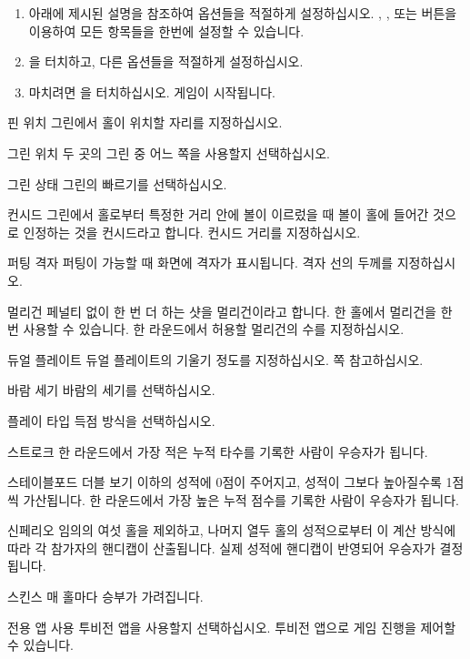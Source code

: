 \documentclass[10pt, openright, language=korean]{hzguide}
\begin{document}
\begin{enumerate}
\item 아래에 제시된 설명을 참조하여 옵션들을 적절하게 설정하십시오. , , 또는  버튼을 이용하여 모든 항목들을 한번에 설정할 수 있습니다.
\item {}을 터치하고, 다른 옵션들을 적절하게 설정하십시오. 
\item 마치려면 을 터치하십시오. 게임이 시작됩니다.
\end{enumerate}

\begin{UI}
\item[핀 위치] 그린에서 홀이 위치할 자리를 지정하십시오.
\item[그린 위치] 두 곳의 그린 중 어느 쪽을 사용할지 선택하십시오.
\item[그린 상태] 그린의 빠르기를 선택하십시오.
\item[컨시드] 그린에서 홀로부터 특정한 거리 안에 볼이 이르렀을 때 볼이 홀에 들어간 것으로 인정하는 것을 컨시드라고 합니다. 컨시드 거리를 지정하십시오.
\item[퍼팅 격자] 퍼팅이 가능할 때 화면에 격자가 표시됩니다. 격자 선의 두께를 지정하십시오.
\item[멀리건] 페널티 없이 한 번 더 하는 샷을 멀리건이라고 합니다. 한 홀에서 멀리건을 한 번 사용할 수 있습니다. 한 라운드에서 허용할 멀리건의 수를 지정하십시오.
\item[듀얼 플레이트] 듀얼 플레이트의 기울기 정도를 지정하십시오. \pageref{sec:swing_plate} 쪽 \를 참고하십시오.
\item[바람 세기] 바람의 세기를 선택하십시오.
\item[플레이 타입] 득점 방식을 선택하십시오.
    \begin{UI}
    \item[스트로크] 한 라운드에서 가장 적은 누적 타수를 기록한 사람이 우승자가 됩니다.
    \item[스테이블포드] 더블 보기 이하의 성적에 0점이 주어지고, 성적이 그보다 높아질수록 1점씩 가산됩니다. 한 라운드에서 가장 높은 누적 점수를 기록한 사람이 우승자가 됩니다.
    \item[신페리오] 임의의 여섯 홀을 제외하고, 나머지 열두 홀의 성적으로부터 이 계산 방식에 따라 각 참가자의 핸디캡이 산출됩니다. 실제 성적에 핸디캡이 반영되어 우승자가 결정됩니다.
    \item[스킨스] 매 홀마다 승부가 가려집니다.
    \end{UI}
\item[전용 앱 사용] 투비전 앱을 사용할지 선택하십시오. 투비전 앱으로 게임 진행을 제어할 수 있습니다.

\end{UI}
\end{document}
